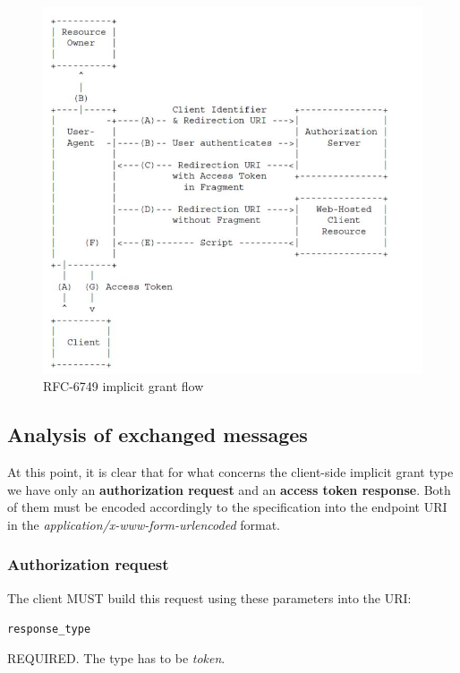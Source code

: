 \begin{figure}[htbp]
    \centering
    \includegraphics[scale=0.6]{chapters/images/chp2/client.jpg}
    \caption{RFC-6749 implicit grant flow}
    \label{fig:flowa}
\end{figure}

\vspace{1cm}

\subsection{Analysis of exchanged messages}
At this point, it is clear that for what concerns the client-side implicit grant type we have only an \textbf{authorization request} and an \textbf{access token response}. Both of them must be encoded accordingly to the specification into the endpoint URI in the \textit{application/x-www-form-urlencoded} format.

\subsubsection{Authorization request}
\label{authreq}
The client MUST build this request using these parameters into the URI:

\texttt{response\_type}

\hspace{0.5cm}REQUIRED. The type has to be \textit{token}.

